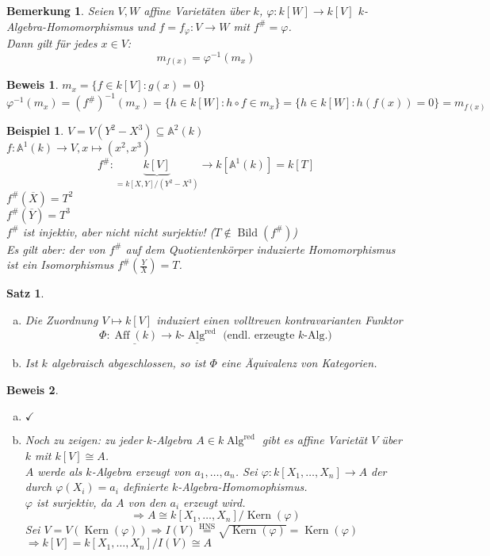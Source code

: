 \documentclass[a4paper,12pt]{report}
\theoremstyle{break}
\newtheorem{Satz}{Satz}
\newtheorem{Bem}[Def]{Bemerkung}
\newtheorem{Bsp}[Def]{Beispiel}
\theoremstyle{nonumberbreak}
\newtheorem{Bew}{Beweis}
\theoremstyle{nonumberplain}
\DeclareMathOperator{\Aff}{Aff}
\DeclareMathOperator{\Alg}{Alg}
\DeclareMathOperator{\Kern}{Kern}
\DeclareMathOperator{\Bild}{Bild}
\DeclareMathOperator{\red}{red}%
\newcommand{\A}{\mathbb{A}}
\begin{document}
\begin{Bem}
Seien $V,W$ affine Variet\"aten \"uber $k$, $\varphi:k[W]\to k[V]$ $k$-Algebra-Homomorphismus und $f= f_{\varphi}: V\to W$ mit $f^{\#}=\varphi$.\\
Dann gilt f\"ur jedes $x\in V$:
	\[ m_{f(x)}=\varphi^{-1}(m_x)\]
\end{Bem}

\begin{Bew}
$m_x=\{f\in k[V]: g(x)=0\}$\\
\[\varphi^{-1}(m_x)=(f^{\#})^{-1}(m_x)=\{h\in k[W]:h\circ f \in m_x\} = \{h\in k[W]:h(f(x))=0\} =m_{f(x)}\]
\end{Bew}

\begin{Bsp}
$V = V(Y^2-X^3)\subseteq\A^2(k)$\\
$f: \A^1(k)\to V, x\mapsto(x^2,x^3)$\\
\[f^{\#}:\underbrace{k[V]}_{=k[X,Y]/(Y^2-X^3)}\to k[\A^1(k)]=k[T]\]
$f^{\#}(\overline X)=T^2$\\
$f^{\#}(\overline Y)=T^3$\\

$f^{\#}$ ist injektiv, aber nicht nicht surjektiv! ($T\notin \Bild(f^{\#})$)\\
Es gilt aber: der von $f^{\#}$ auf dem Quotientenk\"orper induzierte Homomorphismus ist ein Isomorphismus $f^{\#}(\frac{Y}{X}) = T$.
\end{Bsp}

\begin{Satz}\label{satz4}\begin{enumerate}[a)]
\item
	Die Zuordnung $V\mapsto k[V]$ induziert einen volltreuen kontravarianten Funktor
		\[\Phi: \underline{\Aff(k)}\to \underline{k\textrm{-}\Alg^{\red}} \textrm{ (endl. erzeugte }k\textrm{-Alg.)}\]
\item
	Ist $k$ algebraisch abgeschlossen, so ist $\Phi$ eine \"Aquivalenz von Kategorien.
\end{enumerate}\end{Satz}

\begin{Bew}\begin{enumerate}[a)]\item $\checkmark$\item
Noch zu zeigen: zu jeder $k$-Algebra $A\in k\Alg^{\red}$ gibt es affine Variet\"at $V$ \"uber $k$ mit $k[V]\cong A$.\\
$A$ werde als $k$-Algebra erzeugt von $a_1,\dots ,a_n$. Sei $\varphi: k[X_1,\dots ,X_n]\to A$ der durch $\varphi(X_i)=a_i$ definierte $k$-Algebra-Homomophismus.\\
$\varphi$ ist surjektiv, da $A$ von den $a_i$ erzeugt wird.
	\[\Rightarrow A \cong k[X_1,\dots ,X_n]/\Kern(\varphi)\]
Sei $V=V(\Kern(\varphi))\Rightarrow I(V) \stackrel{\textrm{HNS}}{=} \sqrt{\Kern(\varphi)} = \Kern(\varphi)$\\
$\Rightarrow k[V]=k[X_1,\dots ,X_n]/I(V)\cong A$
\end{enumerate}\end{Bew}
\end{document}
